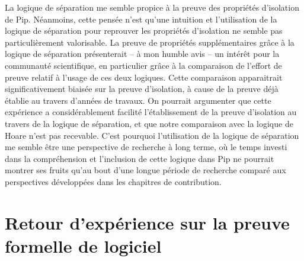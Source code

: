 		La logique de séparation me semble propice à la preuve des propriétés d'isolation de Pip. Néanmoins, cette pensée n'est qu'une intuition et l'utilisation de la logique de séparation pour reprouver les propriétés d'isolation ne semble pas particulièrement valorisable. La preuve de propriétés supplémentaires grâce à la logique de séparation présenterait -- à mon humble avis -- un intérêt pour la communauté scientifique, en particulier grâce à la comparaison de l'effort de preuve relatif à l'usage de ces deux logiques. Cette comparaison apparaitrait significativement biaisée sur la preuve d'isolation, à cause de la preuve déjà établie au travers d'années de travaux. On pourrait argumenter que cette expérience a considérablement facilité l'établissement de la preuve d'isolation au travers de la logique de séparation, et que notre comparaison avec la logique de Hoare n'est pas recevable. C'est pourquoi l'utilisation de la logique de séparation me semble être une perspective de recherche à long terme, où le temps investi dans la compréhension et l'inclusion de cette logique dans Pip ne pourrait montrer ses fruits qu'au bout d'une longue période de recherche comparé aux perspectives développées dans les chapitres de contribution.

		\section{Retour d'expérience sur la preuve formelle de logiciel}

